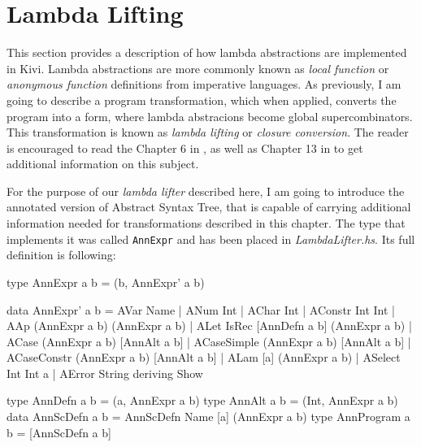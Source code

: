 \documentclass[12pt,a4paper]{report}
\begin{document}

\section{Lambda Lifting}
\label{sec:lambda_lifting}
This section provides a description of how lambda abstractions are implemented
in Kivi. Lambda abstractions are more commonly known as \textit{local function}
or \textit{anonymous function} definitions from imperative languages. As
previously, I am going to describe a program transformation, which when
applied, converts the program into a form, where lambda abstracions become
global supercombinators. This transformation is known as \textit{lambda
lifting} or \textit{closure conversion}. The reader is encouraged to read the
Chapter 6 in \cite{JonLes00}, as well as Chapter 13 in \cite{Jon87} to get
additional information on this subject.

For the purpose of our \textit{lambda lifter} described here, I am going to
introduce the annotated version of Abstract Syntax Tree, that is capable of
carrying additional information needed for transformations described in this
chapter. The type that implements it was called \texttt{AnnExpr} and has
been placed in \textit{LambdaLifter.hs}. Its full definition is following:

\vspace*{0.2in}
\begin{code}[style=haskell,label=lst:annotated_expression]
  type AnnExpr a b = (b, AnnExpr' a b)

  data AnnExpr' a b = AVar Name
                    | ANum Int
                    | AChar Int
                    | AConstr Int Int
                    | AAp (AnnExpr a b) (AnnExpr a b)
                    | ALet IsRec [AnnDefn a b] (AnnExpr a b)
                    | ACase (AnnExpr a b) [AnnAlt a b]
                    | ACaseSimple (AnnExpr a b) [AnnAlt a b]
                    | ACaseConstr (AnnExpr a b) [AnnAlt a b]
                    | ALam [a] (AnnExpr a b)
                    | ASelect Int Int a
                    | AError String
      deriving Show

  type AnnDefn a b = (a, AnnExpr a b)
  type AnnAlt a b = (Int, AnnExpr a b)
  data AnnScDefn a b = AnnScDefn Name [a] (AnnExpr a b)
  type AnnProgram a b = [AnnScDefn a b]
\end{code}
\end{document}
